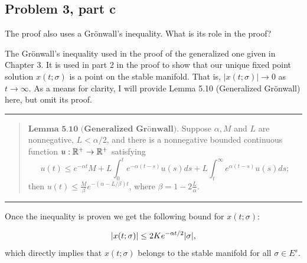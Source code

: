 \newpage
\subsection{Problem 3, part c}
The proof also uses a Gr\"onwall's inequality. What is its role in the proof?
\partbreak
\begin{solution}

    The Gr\"onwall's inequality used in the proof of the generalized one given in Chapter 3. It is used in part 2 in the proof to show that our unique fixed point solution $x(t;\sigma)$ is a point on the stable manifold. That is, $|x(t;\sigma)| \rightarrow 0$ as $t \rightarrow \infty$. As a means for clarity, I will provide Lemma 5.10 (Generalized Gr\"onwall) here, but omit its proof. 
    \begin{center}\rule{0.89\textwidth}{.4pt}\end{center}
    \vspace{-8mm}
    \begin{quote}
    $\textbf{Lemma 5.10 (Generalized Gr\"onwall)}.$ Suppose $\alpha, M$ and $L$ are nonnegative, $L <\alpha /2$, and there is a nonnegative bounded continuous function $u: \mathbb{R}^+ \rightarrow \mathbb{R}^+$ satisfying
    \[
    u(t) \leq e^{-\alpha t}M + L\int_0^te^{-\alpha(t - s)}u(s)ds + L\int_t^\infty e^{\alpha(t - s)}u(s)ds;
    \]
    then $u(t) \leq \frac{M}{\beta} e^{-(\alpha - L/\beta)t}$, where $\beta = 1 - 2\frac{L}{\alpha}$.
    \end{quote}
    \vspace{-10mm}
    \begin{center}\rule{0.89\textwidth}{.4pt}\end{center}
    \jump
    
    Once the inequality is proven we get the following bound for $x(t;\sigma)$:

    \[
    \abs{x(t;\sigma)} \leq 2Ke^{-\alpha t/2}\abs{\sigma},
    \]
    which directly implies that $x(t; \sigma)$ belongs to the stable manifold for all $\sigma \in E^s.$
\end{solution}
\newpage
\printbibliography
